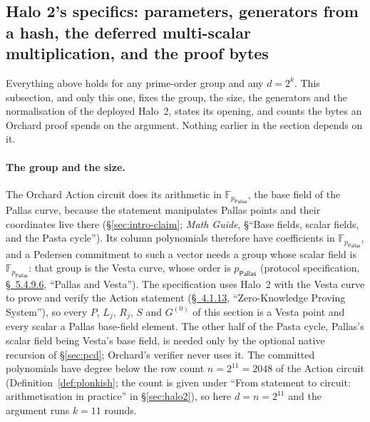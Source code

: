 \documentclass[11pt,a4paper]{article}
\theoremstyle{definition}
\newcommand{\F}{\mathbb{F}}
\newcommand{\Pallas}{\ensuremath{\mathsf{Pallas}}}
\begin{document}
\subsection{Halo 2's specifics: parameters, generators from a hash, the
  deferred multi-scalar multiplication, and the proof bytes}
\label{sec:ipa-halo2}

Everything above holds for any prime-order group and any $d = 2^{k}$.
This subsection, and only this one, fixes the group, the size, the
generators and the normalisation of the deployed Halo~2, states its
opening, and counts the bytes an Orchard proof spends on the argument.
Nothing earlier in the section depends on it.

\paragraph{The group and the size.}
The Orchard Action circuit does its arithmetic in $\F_{p_{\Pallas}}$,
the base field of the Pallas curve, because the statement manipulates
Pallas points and their coordinates live there (\S\ref{sec:intro-claim};
\emph{Math Guide}, \S``Base fields, scalar fields, and the Pasta
cycle''). Its column polynomials therefore have coefficients in
$\F_{p_{\Pallas}}$, and a Pedersen commitment to such a vector needs a
group whose scalar field is $\F_{p_{\Pallas}}$: that group is the Vesta
curve, whose order is $p_{\Pallas}$ (protocol specification,
\href{https://zips.z.cash/protocol/protocol.pdf\#pallasandvesta}{\S~5.4.9.6},
``Pallas and Vesta''). The specification uses Halo~2 with the Vesta curve
to prove and verify the Action statement
(\href{https://zips.z.cash/protocol/protocol.pdf\#abstractzk}{\S~4.1.13},
``Zero-Knowledge Proving System''), so every $P$, $L_j$, $R_j$, $S$ and
$G^{(0)}$ of this section is a Vesta point and every scalar a Pallas
base-field element.
The other half of the Pasta cycle, Pallas's scalar field being Vesta's
base field, is needed only by the optional native recursion of
\S\ref{sec:pcd}; Orchard's verifier never uses it. The committed
polynomials have degree below the row count $n = 2^{11} = 2048$ of the
Action circuit (Definition~\ref{def:plonkish}; the count is given under
``From statement to circuit: arithmetisation in practice'' in
\S\ref{sec:halo2}), so here $d = n = 2^{11}$ and the argument runs
$k = 11$ rounds.
\end{document}
